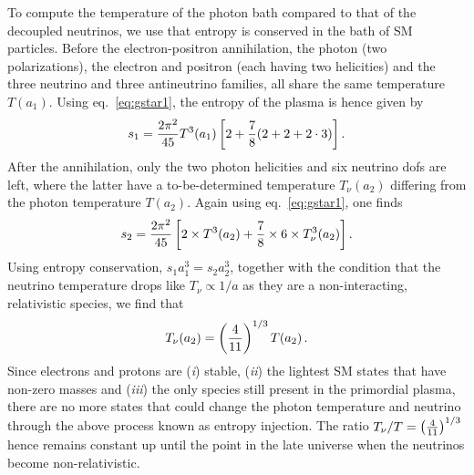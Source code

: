 To compute the temperature of the photon bath compared to that of the decoupled neutrinos, we use that entropy is conserved in the bath of \ac{SM} particles. Before the electron-positron annihilation,  the photon (two polarizations), the electron and positron (each having two helicities) and the three neutrino and three antineutrino families, all share the same temperature $T(a_1)$. Using eq.~\eqref{eq:gstar1}, the entropy of the plasma is hence given by
\begin{align}
	s_1 = \frac{2 \pi^2}{45} T^3(a_1) \left[ 2 + \frac{7}{8} (2 + 2 + 2 \cdot 3) \right] .
\end{align}
After the annihilation, only the two photon helicities and six neutrino \acp{dof} are left, where the latter have a to-be-determined temperature $T_\nu(a_2)$ differing from the photon temperature $T(a_2)$. Again using eq.~\eqref{eq:gstar1}, one finds
\begin{align}
	s_2 = \frac{2 \pi^2}{45} \left[ 2 \times T^3(a_2) + \frac{7}{8} \times 6 \times  T_\nu^3(a_2) \right] .
\end{align}
Using entropy conservation, $s_1 a_1^3 = s_2 a_2^3$, together with the condition that the neutrino temperature drops like $T_\nu \propto 1/a$ as they are a non-interacting, relativistic species, we find that
\begin{align}
	T_\nu(a_2) = \left( \frac{4}{11} \right)^{1/3} T(a_2) \, .
\end{align}
Since electrons and protons are (\textit{i}) stable, (\textit{ii}) the lightest \ac{SM} states that have non-zero masses and (\textit{iii}) the only species still present in the primordial plasma, there are no more states that could change the photon temperature and neutrino through the above process known as entropy injection. The ratio $T_\nu / T = \left( \frac{4}{11} \right)^{1/3}$ hence remains constant up until the point in the late universe when the neutrinos become non-relativistic.

